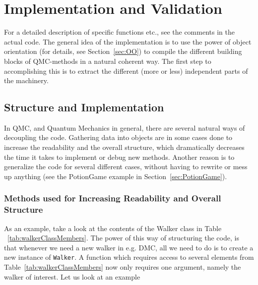 \chapter{Implementation and Validation}

For a detailed description of specific functions etc., see the comments in the actual code. The general idea of the implementation is to use the power of object orientation (for details, see Section~\ref{sec:OO}) to compile the different building blocks of QMC-methods in a natural coherent way. The first step to accomplishing this is to extract the different (more or less) independent parts of the machinery.

\section{Structure and Implementation}

In QMC, and Quantum Mechanics in general, there are several natural ways of decoupling the code. Gathering data into objects are in some cases done to increase the readability and the overall structure, which dramatically decreases the time it takes to implement or debug new methods. Another reason is to generalize the code for several different cases, without having to rewrite or mess up anything (see the PotionGame example in Section~\ref{sec:PotionGame}).

\subsection{Methods used for Increasing Readability and Overall Structure}

As an example, take a look at the contents of the Walker class in Table ~\ref{tab:walkerClassMembers}. The power of this way of structuring the code, is that whenever we need a new walker in e.g. DMC, all we need to do is to create a new instance of \verb+Walker+. A function which requires access to several elements from Table~\ref{tab:walkerClassMembers} now only requires one argument, namely the walker of interest. Let us look at an example

